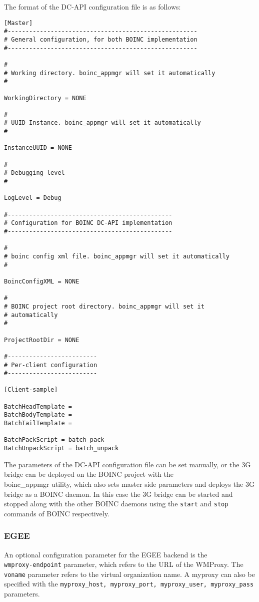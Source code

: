 \documentclass[a4paper, 12pt]{article}
\begin{document}
The format of the DC-API configuration file is as follows:

\begin{verbatim}
[Master]
#-----------------------------------------------------
# General configuration, for both BOINC implementation
#-----------------------------------------------------

#
# Working directory. boinc_appmgr will set it automatically
#

WorkingDirectory = NONE

#
# UUID Instance. boinc_appmgr will set it automatically
#

InstanceUUID = NONE

#
# Debugging level
#

LogLevel = Debug

#----------------------------------------------
# Configuration for BOINC DC-API implementation
#----------------------------------------------

#
# boinc config xml file. boinc_appmgr will set it automatically
#

BoincConfigXML = NONE

#
# BOINC project root directory. boinc_appmgr will set it 
# automatically
#

ProjectRootDir = NONE

#-------------------------
# Per-client configuration
#-------------------------

[Client-sample]

BatchHeadTemplate =
BatchBodyTemplate =
BatchTailTemplate =

BatchPackScript = batch_pack
BatchUnpackScript = batch_unpack
\end{verbatim}
The parameters of the DC-API configuration file can be set manually, or the 3G bridge can be deployed on the BOINC project with the \\ boinc\_appmgr utility, which also sets master side parameters and deploys the 3G bridge as a BOINC daemon. In this case the 3G bridge can be started and stopped along with the other BOINC daemons using the {\tt start} and {\tt stop} commands of BOINC respectively. 

\subsubsection{EGEE}

An optional configuration parameter for the EGEE backend is the \\ {\tt wmproxy-endpoint} parameter, which refers to the URL of the WMProxy. The {\tt voname} parameter refers to the virtual organization name. A myproxy can also be specified with the {\tt myproxy\_host, myproxy\_port, myproxy\_user, myproxy\_pass} parameters.
\end{document}
